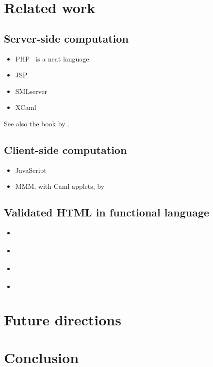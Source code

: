 \documentclass{acm_proc_article-sp}
\begin{document}
\section{Related work}

\subsection{Server-side computation}
\label{sec:related-server}

\begin{itemize}
\item PHP~\cite{bakken04php} is a neat language.
\item JSP~\cite{mahmoud03jsp}
\item SMLserver~\cite{elsman02smlserver,elsman03web}
\item XCaml~\cite{baretta04xcaml}
\end{itemize}

See also the book by \citet{greenspun99panda}.

\subsection{Client-side computation}
\label{sec:related-client}
\begin{itemize}
\item JavaScript \cite{ecmascript99,flanagan01javascript}
\item MMM, with Caml applets, by \citet{rouaix96web}
\end{itemize}

\subsection{Validated HTML in functional language}
\begin{itemize}
\item \citet{elsman04typing}
\item \citet{wallace99haxml}
\item \citet{ohl04xhtml}
\item \citet{hosoya03xduce}
\end{itemize}

\section{Future directions}

\section{Conclusion}



\end{document}
